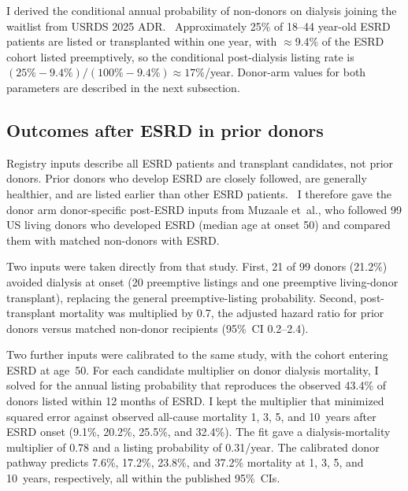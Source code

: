 I derived the conditional annual probability of non-donors on dialysis joining the waitlist from USRDS 2025 ADR.~\cite{usrds_2025} Approximately 25\% of 18--44 year-old ESRD patients are listed or transplanted within one year, with $\approx$9.4\% of the ESRD cohort listed preemptively, so the conditional post-dialysis listing rate is $(25\%-9.4\%)/(100\%-9.4\%)\approx17\%$/year. Donor-arm values for both parameters are described in the next subsection.

\subsection{Outcomes after ESRD in prior donors}
\label{sec:methods-donor-esrd}
Registry inputs describe all ESRD patients and transplant candidates, not prior donors. Prior donors who develop ESRD are closely followed, are generally healthier, and are listed earlier than other ESRD patients.~\cite{muzaale2016outcomes} I therefore gave the donor arm donor-specific post-ESRD inputs from Muzaale et~al., who followed 99 US living donors who developed ESRD (median age at onset 50) and compared them with matched non-donors with ESRD.~\cite{muzaale2016outcomes}

Two inputs were taken directly from that study. First, 21 of 99 donors (21.2\%) avoided dialysis at onset (20 preemptive listings and one preemptive living-donor transplant), replacing the general preemptive-listing probability. Second, post-transplant mortality was multiplied by 0.7, the adjusted hazard ratio for prior donors versus matched non-donor recipients (95\%~CI 0.2--2.4).

Two further inputs were calibrated to the same study, with the cohort entering ESRD at age~50. For each candidate multiplier on donor dialysis mortality, I solved for the annual listing probability that reproduces the observed 43.4\% of donors listed within 12 months of ESRD. I kept the multiplier that minimized squared error against observed all-cause mortality 1, 3, 5, and 10~years after ESRD onset (9.1\%, 20.2\%, 25.5\%, and 32.4\%). The fit gave a dialysis-mortality multiplier of 0.78 and a listing probability of 0.31/year. The calibrated donor pathway predicts 7.6\%, 17.2\%, 23.8\%, and 37.2\% mortality at 1, 3, 5, and 10~years, respectively, all within the published 95\%~CIs.


